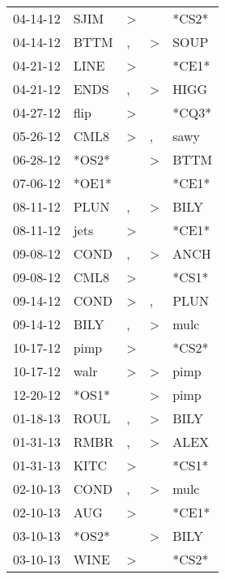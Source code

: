 \begin{supertabular}{lllll}
 04-14-12 &   SJIM &     \textgreater &                  &  *CS2* \\
 04-14-12 &   BTTM &                , &     \textgreater &   SOUP \\
 04-21-12 &   LINE &     \textgreater &                  &  *CE1* \\
 04-21-12 &   ENDS &                , &     \textgreater &   HIGG \\
 04-27-12 &   flip &     \textgreater &                  &  *CQ3* \\
 05-26-12 &   CML8 &     \textgreater &                , &   sawy \\
 06-28-12 &  *OS2* &                  &     \textgreater &   BTTM \\
 07-06-12 &  *OE1* &                  &                  &  *CE1* \\
 08-11-12 &   PLUN &                , &     \textgreater &   BILY \\
 08-11-12 &   jets &     \textgreater &                  &  *CE1* \\
 09-08-12 &   COND &                , &     \textgreater &   ANCH \\
 09-08-12 &   CML8 &     \textgreater &                  &  *CS1* \\
 09-14-12 &   COND &     \textgreater &                , &   PLUN \\
 09-14-12 &   BILY &                , &     \textgreater &   mulc \\
 10-17-12 &   pimp &     \textgreater &                  &  *CS2* \\
 10-17-12 &   walr &     \textgreater &     \textgreater &   pimp \\
 12-20-12 &  *OS1* &                  &     \textgreater &   pimp \\
 01-18-13 &   ROUL &                , &     \textgreater &   BILY \\
 01-31-13 &   RMBR &                , &     \textgreater &   ALEX \\
 01-31-13 &   KITC &     \textgreater &                  &  *CS1* \\
 02-10-13 &   COND &                , &     \textgreater &   mulc \\
 02-10-13 &    AUG &     \textgreater &                  &  *CE1* \\
 03-10-13 &  *OS2* &                  &     \textgreater &   BILY \\
 03-10-13 &   WINE &     \textgreater &                  &  *CS2* \\

\end{supertabular}
